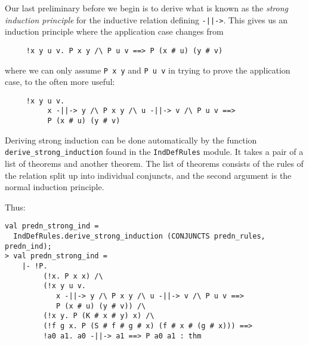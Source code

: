 Our last preliminary before we begin is to derive what is known as the
\emph{strong induction principle} for the inductive relation
defining \texttt{-||->}.  This gives us an induction principle where
the application case changes from
\begin{verbatim}
     !x y u v. P x y /\ P u v ==> P (x # u) (y # v)
\end{verbatim}
where we can only assume \texttt{P x y} and \texttt{P u v} in trying
to prove the application case, to the often more useful:
\begin{verbatim}
     !x y u v.
          x -||-> y /\ P x y /\ u -||-> v /\ P u v ==>
          P (x # u) (y # v)
\end{verbatim}
Deriving strong induction can be done automatically by the function\linebreak
\texttt{derive\_strong\_induction} found in the \texttt{IndDefRules}
module.  It takes a pair of a list of theorems and another theorem.
The list of theorems consists of the rules of the relation split up
into individual conjuncts, and the second argument is the normal
induction principle.

Thus:
\begin{session}
\begin{verbatim}
val predn_strong_ind =
  IndDefRules.derive_strong_induction (CONJUNCTS predn_rules, predn_ind);
> val predn_strong_ind =
    |- !P.
         (!x. P x x) /\
         (!x y u v.
            x -||-> y /\ P x y /\ u -||-> v /\ P u v ==>
            P (x # u) (y # v)) /\
         (!x y. P (K # x # y) x) /\
         (!f g x. P (S # f # g # x) (f # x # (g # x))) ==>
         !a0 a1. a0 -||-> a1 ==> P a0 a1 : thm
\end{verbatim}
\end{session}
\eos{}

